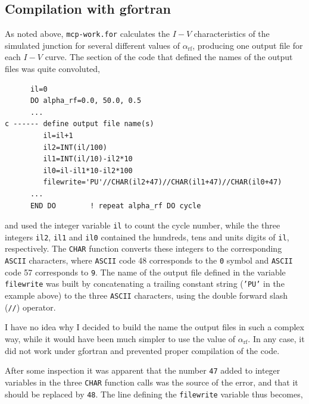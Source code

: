 \subsection{Compilation with gfortran}
\label{compilation-with-gfortran}

As noted above, \texttt{mcp-work.for} calculates the $I - V$ characteristics of the simulated junction for several different values of $\alpha_\mathrm{rf}$, producing one output file for each $I - V$ curve. The section of the code that defined the names of the output files was quite convoluted,

\begin{verbatim}
      il=0
      DO alpha_rf=0.0, 50.0, 0.5
      ...
c ------ define output file name(s)
         il=il+1
         il2=INT(il/100)
         il1=INT(il/10)-il2*10
         il0=il-il1*10-il2*100
         filewrite='PU'//CHAR(il2+47)//CHAR(il1+47)//CHAR(il0+47)
      ...
      END DO        ! repeat alpha_rf DO cycle

\end{verbatim}

and used the integer variable \texttt{il} to count the cycle number, while the three integers \texttt{il2}, \texttt{il1} and \texttt{il0} contained the hundreds, tens and units digits of \texttt{il}, respectively. 
The \texttt{CHAR} function converts these integers to the corresponding \texttt{ASCII} characters, where \texttt{ASCII} code 48 corresponds to the \texttt{0} symbol and \texttt{ASCII} code 57 corresponds to \texttt{9}.
The name of the output file defined in the variable \texttt{filewrite} was built by concatenating a trailing constant string (\texttt{'PU'} in the example above) to the three \texttt{ASCII} characters, using the double forward slash (\texttt{//}) operator.

I have no idea why I decided to build the name the output files in such a complex way, while it would have been much simpler to use the value of $\alpha_\mathrm{rf}$.
In any case, it did not work under gfortran and prevented proper compilation of the code. 

After some inspection it was apparent that the number \texttt{47} added to integer variables in the three \texttt{CHAR} function calls was the source of the error, and that it should be replaced by \texttt{48}. 
The line defining the \texttt{filewrite} variable thus becomes,

